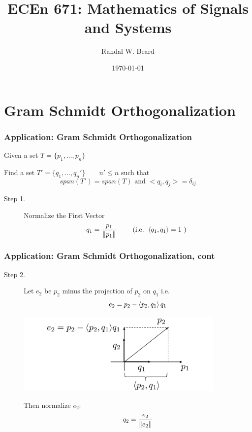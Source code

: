 \documentclass{beamer}
\title{ECEn 671: Mathematics of Signals and Systems}
\author{Randal W. Beard}
\institute{Brigham Young University}
\date{\today}
\begin{document}
\begin{frame}
	\titlepage
\end{frame}




\section{Gram Schmidt Orthogonalization}
\frame{\sectionpage}


\begin{frame}\frametitle{Application:  Gram Schmidt Orthogonalization}
\noindent Given a set $T = \{ p_1, \ldots, p_n\}$

\noindent Find a set $T' = \{q_1, \ldots, q_n'\} \qquad n' \leq n$ such that
\[ span(T') = span(T) \text{ and } <q_i,q_j> = \delta_{ij} \]

\begin{description}
\item[Step 1.]
Normalize the First Vector
\[ q_1 = \frac{p_1}{\left\| p_1 \right\|} \qquad \text{ (i.e. } \left< q_1,q_1 \right>=1 \text{ ) } \]
\end{description}
\end{frame}

\begin{frame}\frametitle{Application:  Gram Schmidt Orthogonalization, cont}

\begin{description}
\item[Step 2.]	
Let $e_2$ be $p_2$ minus the projection of $p_2$ on $q_1$
i.e.
\[ e_2 = p_2 - \left< p_2, q_1\right> q_1 \]

\begin{center}
\includegraphics[width=4in]{figures/chap2_gram_schmidt}
\end{center}

Then normalize $e_2$:
\[ q_2 = \frac{e_2}{\left\| e_2 \right\|} \]
\end{description}
\end{frame}
\end{document}

